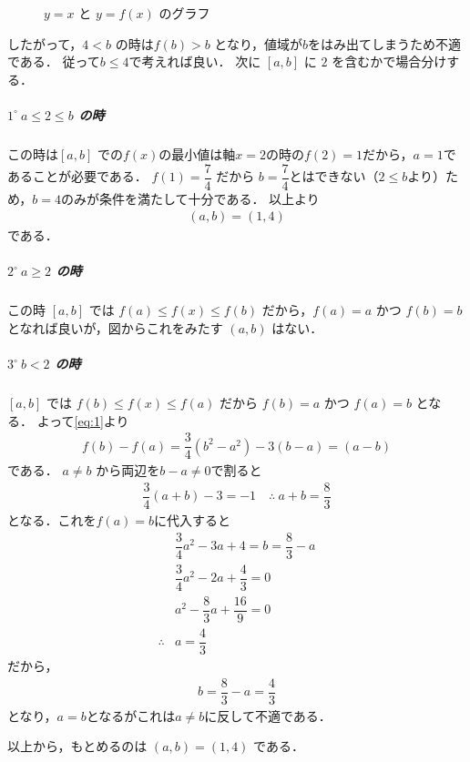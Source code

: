 \documentclass[../../main.tex]{subfiles}
\begin{document}
\begin{figure}[htb]
\begin{tikzpicture}[scale=1.6, >=stealth, every node/.style={font=\small}]
  \end{tikzpicture}
  \caption{$y=x$ と $y=f(x)$ のグラフ}
\end{figure}

したがって，$4<b$ の時は$f(b)>b$ となり，値域が$b$をはみ出てしまうため不適である．
従って$b \le 4$で考えれば良い．
次に $[a,b]$ に $2$ を含むかで場合分けする．

\subparagraph{$1^\circ\ a\le2\le b$ の時}

この時は$[a,b]$ での$f(x)$の最小値は軸$x=2$の時の$f(2)=1$だから，$a=1$であることが必要である．
$f(1)=\dfrac{7}{4}$ だから $b=\dfrac{7}{4}$とはできない（$2 \le b$より）ため，$b=4$のみが条件を満たして十分である．
以上より
\begin{align}
  (a,b) = \left(1,4\right) \label{eq:2}
\end{align}
である．

\subparagraph{$2^\circ\ a\ge2$ の時}

この時 $[a,b]$ では $f(a)\le f(x)\le f(b)$ だから，$f(a)=a$ かつ $f(b)=b$ となれば良いが，図からこれをみたす $(a,b)$ はない．

\subparagraph{$3^\circ\ b<2$ の時}

$[a,b]$ では $f(b)\le f(x)\le f(a)$ だから $f(b)=a$ かつ $f(a)=b$ となる．
よって\cref{eq:1}より
\begin{align}
  f(b)-f(a)=\dfrac{3}{4}(b^2-a^2)-3(b-a)=(a-b)
\end{align}
である．
$a\ne b$ から両辺を$b-a \neq 0$で割ると
\begin{align}
  \dfrac{3}{4}(a+b)-3=-1 \quad\therefore\ a+b=\dfrac{8}{3}
\end{align}
となる．これを$f(a)=b$に代入すると
\begin{align}
  &\dfrac{3}{4}a^2-3a+4 = b = \dfrac{8}{3} - a \\
  &\dfrac{3}{4}a^2-2a+\dfrac{4}{3} = 0 \\
  &a^2-\dfrac{8}{3}a+\dfrac{16}{9} = 0 \\
  \therefore
  &a = \dfrac{4}{3}
\end{align}
だから，
\begin{align}
  b = \dfrac{8}{3} - a = \dfrac{4}{3}
\end{align}
となり，$a=b$となるがこれは$a\neq b$に反して不適である．
\casesend

以上から，もとめるのは $(a,b)=(1,4)$ である．

\newpage
\end{document}

